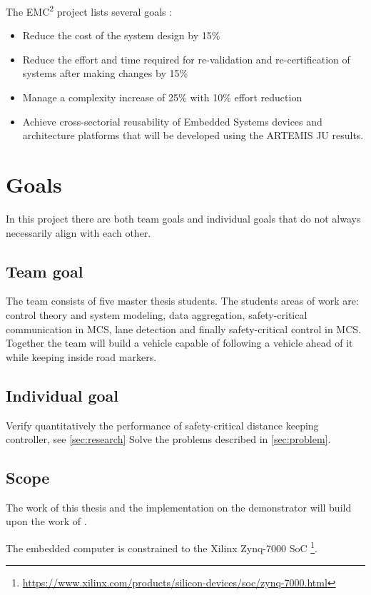The EMC\textsuperscript{2} project lists several goals \cite{website:emc2goals}:
\begin{itemize}
\item Reduce the cost of the system design by 15\%
\item Reduce the effort and time required for re-validation and re-certification of systems after making changes by 15\%
\item Manage a complexity increase of 25\% with 10\% effort reduction
\item Achieve cross-sectorial reusability of Embedded Systems devices and architecture platforms that will be developed using the ARTEMIS JU results.
\end{itemize}

\section{Goals}
In this project there are both team goals and individual goals that do not always necessarily align with each other. 

\subsection{Team goal}
The team consists of five master thesis students. The students areas of work are: control theory and system modeling, data aggregation, safety-critical communication in MCS, lane detection and finally safety-critical control in MCS. Together the team will build a vehicle capable of following a vehicle ahead of it while keeping inside road markers.

\subsection{Individual goal}
Verify quantitatively the performance of safety-critical distance keeping controller, see \ref{sec:research} Solve the problems described in \ref{sec:problem}.

\subsection{Scope}
\label{sec:scope}
The work of this thesis and the implementation on the demonstrator will build upon the work of \cite{zaki2016}.

The embedded computer is constrained to the Xilinx Zynq-7000 SoC \footnote{\url{https://www.xilinx.com/products/silicon-devices/soc/zynq-7000.html}}. 

